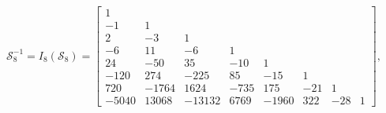 \begin{example}
\begin{displaymath}
\end{displaymath}
\begin{displaymath}
\mathcal{S}_{8}^{-1} ={I_{ 8 }}{\left (\mathcal{S}_{ 8 } \right )} = \left[\begin{matrix}1 &  &  &  &  &  &  & \\-1 & 1 &  &  &  &  &  & \\2 & -3 & 1 &  &  &  &  & \\-6 & 11 & -6 & 1 &  &  &  & \\24 & -50 & 35 & -10 & 1 &  &  & \\-120 & 274 & -225 & 85 & -15 & 1 &  & \\720 & -1764 & 1624 & -735 & 175 & -21 & 1 & \\-5040 & 13068 & -13132 & 6769 & -1960 & 322 & -28 & 1\end{matrix}\right],
\end{displaymath}
\begin{displaymath}

\end{displaymath}
\end{example}
